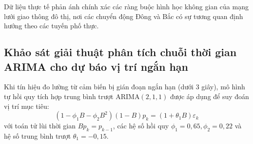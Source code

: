\begin{table}[H]
\centering
\caption{Hệ số tương quan chéo không gian giữa các trục tọa độ trên dữ liệu thực tế và mô hình tổng hợp}
\label{tab:spatial-cross-correlation-table}
\end{table}

Dữ liệu thực tế phản ánh chính xác các ràng buộc hình học không gian của mạng lưới giao thông đô thị, nơi các chuyển động Đông và Bắc có sự tương quan định hướng theo các tuyến phố thực.

\subsection{Khảo sát giải thuật phân tích chuỗi thời gian ARIMA cho dự báo vị trí ngắn hạn}

\hspace{0.5cm} Khi tín hiệu đo lường từ cảm biến bị gián đoạn ngắn hạn (dưới $3$ giây), mô hình tự hồi quy tích hợp trung bình trượt $\text{ARIMA}(2, 1, 1)$ được áp dụng để suy đoán vị trí mục tiêu:
\begin{equation}
(1 - \phi_1 B - \phi_2 B^2)(1 - B) p_k = (1 + \theta_1 B) \varepsilon_k
\label{eq:arima-dead-reckoning-formula}
\end{equation}
với toán tử lùi thời gian $B p_k = p_{k-1}$, các hệ số hồi quy $\phi_1 = 0{,}65, \phi_2 = 0{,}22$ và hệ số trung bình trượt $\theta_1 = -0{,}15$.

